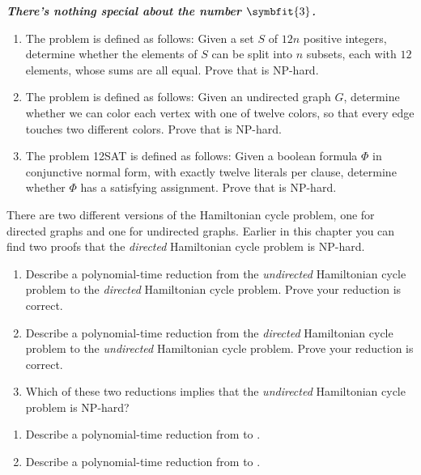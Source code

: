 \begin{exercises}
\item \textbf{\textit{There’s nothing special about the number $\symbfit{3}$.}}
\begin{enumerate}
\item The problem  is defined as follows: Given a set $S$ of $12n$ positive integers, determine whether the elements of $S$ can be split into $n$ subsets, each with $12$ elements, whose sums are all equal.
Prove that  is NP-hard.
\item The problem  is defined as follows: Given an undirected graph $G$, determine whether we can color each vertex with one of twelve colors, so that every edge touches two different colors.
Prove that  is NP-hard.
\item The problem 12SAT is defined as follows: Given a boolean formula $\Phi$ in conjunctive normal form, with exactly twelve literals per clause, determine whether $\Phi$ has a satisfying assignment.
Prove that  is NP-hard.
\end{enumerate}

\item There are two different versions of the Hamiltonian cycle problem, one for directed graphs and one for undirected graphs.
Earlier in this chapter you can find two proofs that the \textit{directed} Hamiltonian cycle problem is NP-hard.
\begin{enumerate}
\item Describe a polynomial-time reduction from the \textit{undirected} Hamiltonian cycle problem to the \textit{directed} Hamiltonian cycle problem.
Prove your reduction is correct.
\item Describe a polynomial-time reduction from the \textit{directed} Hamiltonian cycle problem to the \textit{undirected} Hamiltonian cycle problem.
Prove your reduction is correct.
\item Which of these two reductions implies that the \textit{undirected} Hamiltonian cycle problem is NP-hard?
\end{enumerate}

\item
\begin{enumerate}
\item Describe a polynomial-time reduction from  to .
\item Describe a polynomial-time reduction from  to .
\end{enumerate}


\end{exercises}
